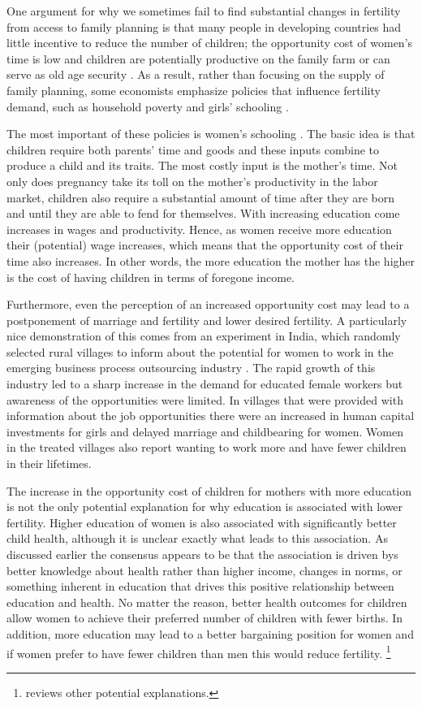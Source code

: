 \documentclass[letterpaper,12pt]{article}
\begin{document}
One argument for why we sometimes fail to find substantial changes in
fertility from access to family planning is that many people in
developing countries had little incentive to reduce the number of
children; the opportunity cost of women's time is low and children are
potentially productive on the family farm or can serve as old age
security \citep{Banerjee2014,Lambert2016}. 
As a result, rather than focusing on the supply of family planning, some
economists emphasize policies that influence fertility demand, such as
household poverty and girls' schooling
\citep{pritchett94a,DasGupta2011}.

The most important of these policies is women's schooling
\citep{schultz02}. 
The basic idea is that children require both parents' time and goods and
these inputs combine to produce a child and its traits. 
The most costly input is the mother's time. 
Not only does pregnancy take its toll on the mother's productivity in
the labor market, children also require a substantial amount of time
after they are born and until they are able to fend for themselves. 
With increasing education come increases in wages and productivity. 
Hence, as women receive more education their (potential) wage increases,
which means that the opportunity cost of their time also increases. 
In other words, the more education the mother has the higher is the cost
of having children in terms of foregone income.

Furthermore, even the perception of an increased opportunity cost may
lead to a postponement of marriage and fertility and lower desired
fertility. 
A particularly nice demonstration of this comes from an experiment in
India, which randomly selected rural villages to inform about the
potential for women to work in the emerging business process outsourcing
industry \citep{Jensen2012}. 
The rapid growth of this industry led to a sharp increase in the demand
for educated female workers but awareness of the opportunities were
limited. 
In villages that were provided with information about the job
opportunities there were an increased in human capital investments for
girls and delayed marriage and childbearing for women. 
Women in the treated villages also report wanting to work more and have
fewer children in their lifetimes.

The increase in the opportunity cost of children for mothers with more
education is not the only potential explanation for why education is
associated with lower fertility. 
Higher education of women is also associated with significantly better
child health, although it is unclear exactly what leads to this
association. 
As discussed earlier the consensus appears to be that the association is
driven bys better knowledge about health rather than higher income,
changes in norms, or something inherent in education that drives this
positive relationship between education and health. 
No matter the reason, better health outcomes for children allow women to
achieve their preferred number of children with fewer births. 
In addition, more education may lead to a better bargaining position for
women and if women prefer to have fewer children than men this would
reduce fertility.%
\footnote{
\citet{Ainsworth1996} reviews other potential explanations.}
\end{document}
